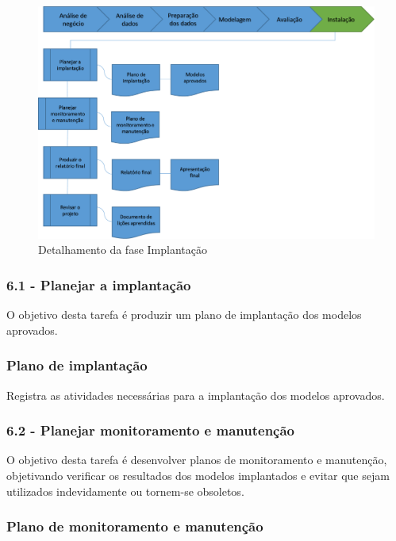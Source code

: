 
\begin{figure}[H]
	\includegraphics[scale=0.8]{img/CRISP-DM-Implantacao.png}
	\caption{Detalhamento da fase Implantação}
	\label{img:CRISP-DM-Implantação}
\end{figure}


\subsubsection*{\textbf{6.1 - Planejar a implantação}}

O objetivo desta tarefa é produzir um plano de implantação dos modelos aprovados.

\subsubsection*{Plano de implantação}

Registra as atividades necessárias para a implantação dos modelos aprovados.

\subsubsection*{\textbf{6.2 - Planejar monitoramento e manutenção}}

O objetivo desta tarefa é desenvolver planos de monitoramento e manutenção, objetivando verificar os resultados dos modelos implantados e evitar que sejam utilizados indevidamente ou tornem-se obsoletos.

\subsubsection*{Plano de monitoramento e manutenção}

